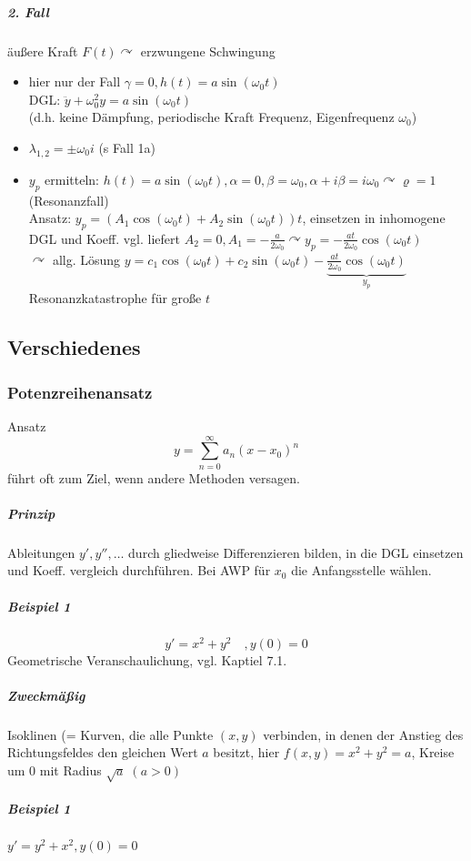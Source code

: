 \documentclass[a4paper]{scrartcl}
\begin{document}
\subparagraph{2. Fall} äußere Kraft $F(t) \curvearrowright$ erzwungene Schwingung
\begin{itemize}
\item hier nur der Fall $\gamma = 0, h(t) = a \sin{(\omega_0 t)}$\\
DGL: $\ddot{y} + \omega_0^2 y = a \sin{(\omega_0 t)}$\\
(d.h. keine Dämpfung, periodische Kraft Frequenz, Eigenfrequenz $\omega_0$)\\
\item $\lambda_{1,2} = \pm \omega_0 i$ (s Fall 1a)
\item $y_p$ ermitteln: $h(t) = a \sin{(\omega_0 t)}, \alpha = 0, \beta = \omega_0, \alpha + i \beta = i \omega_0 \curvearrowright \varrho = 1$ (Resonanzfall)\\
Ansatz: $y_p = (A_1 \cos{(\omega_0 t)} + A_2 \sin{(\omega_0 t)} ) t$, einsetzen in inhomogene DGL und Koeff. vgl. liefert $A_2 = 0,A_1 = - \frac{a}{2\omega_0} \curvearrowright y_p = - \frac{a t}{2 \omega_0} \cos{(\omega_0 t)}$\\
$\curvearrowright$ allg. Lösung $y= c_1 \cos{(\omega_0 t)} + c_2 \sin{(\omega_0 t)} - \underbrace{\frac{a t}{2 \omega_0} \cos{(\omega_0 t)}}_{y_p}$\\
Resonanzkatastrophe für große $t$
\end{itemize}

\subsection{Verschiedenes}%
\subsubsection{Potenzreihenansatz}
Ansatz \[ y= \sum\limits_{n=0}^{\infty} a_n(x-x_0)^n\] führt oft zum Ziel, wenn andere Methoden versagen.

\subparagraph{Prinzip} Ableitungen $y',y'',\dots$ durch gliedweise Differenzieren bilden, in die DGL einsetzen und Koeff. vergleich durchführen. Bei AWP für $x_0$ die Anfangsstelle wählen.
\subparagraph{Beispiel 1} \[ y' = x^2 + y^2 \quad , y(0) = 0\]
Geometrische Veranschaulichung, vgl. Kaptiel 7.1.

\subparagraph{Zweckmäßig} Isoklinen (= Kurven, die alle Punkte $(x,y)$ verbinden, in denen der Anstieg des Richtungsfeldes den gleichen Wert $a$ besitzt, hier $f(x,y) = x^2 + y^2 = a$, Kreise um $0$ mit Radius $\sqrt{a}\; ( a>0)$

\subparagraph{Beispiel 1} $y'= y^2 +x^2, y(0) = 0$\\
\end{document}
